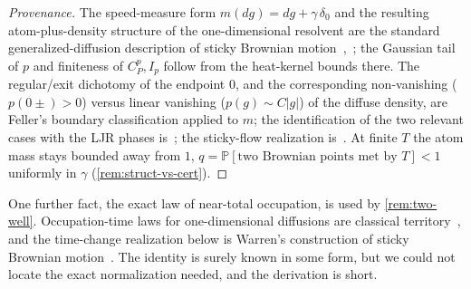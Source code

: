 \documentclass[reqno,final,11pt]{amsart}
\theoremstyle{plain}
\theoremstyle{definition}
\theoremstyle{remark}
\newcommand{\Prob}{\mathbb P}
\begin{document}
\begin{proof}[Provenance]
The speed-measure form $m(dg)=dg+\gamma\,\delta_0$ and the resulting
atom-plus-density structure of the one-dimensional resolvent are the standard
generalized-diffusion description of sticky Brownian
motion~\citep[\S4.11]{ItoMcKean},~\citep{EngelbertPeskir}; the Gaussian tail of $p$
and finiteness of $C^p_P,I_p$ follow from the heat-kernel bounds there. The
regular/exit dichotomy of the endpoint $0$, and the corresponding non-vanishing
($p(0\pm)>0$) versus linear vanishing ($p(g)\sim C|g|$) of the diffuse density,
are Feller's boundary classification applied to $m$; the identification of the
two relevant cases with the LJR phases is~\citep[\S9]{LJR-FCN}; the sticky-flow
realization is~\citep{HowittWarren}. At finite $T$ the atom mass stays bounded
away from $1$, $q=\Prob[\text{two Brownian points met by }T]<1$ uniformly in
$\gamma$ (\cref{rem:struct-vs-cert}).
\end{proof}

One further fact, the exact law of near-total occupation, is used by
\cref{rem:two-well}. Occupation-time laws for one-dimensional diffusions are
classical territory~\citep{SalminenStenlund}, and the time-change realization
below is Warren's construction of sticky Brownian motion~\citep{Warren97}. The
identity is surely known in some form, but we could not locate the exact
normalization needed, and the derivation is short.
\end{document}
